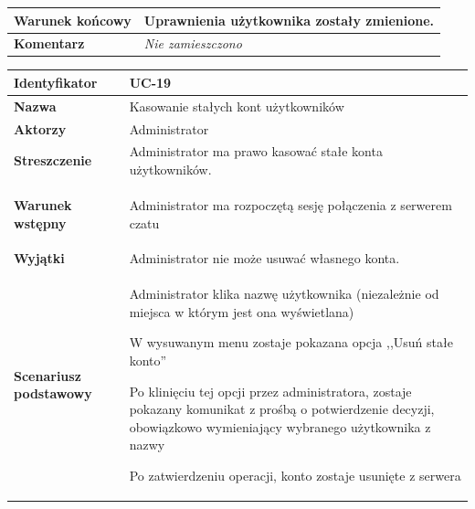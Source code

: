 {\begin{tabular}{ | l | l | }
	\hline
		\parbox[t]{4cm}{\textbf{Warunek końcowy}} & \parbox[t]{11cm}{
			Uprawnienia użytkownika zostały zmienione.
		}
		\\
		
	\hline
		\parbox[t]{4cm}{\textbf{Komentarz}} & \parbox[t]{11cm}{
			\textit{Nie zamieszczono}
		}
		\\

	\hline
\end{tabular}

\vspace{2em}

\begin{tabular}{ | l | l | }
	\hline
		\textbf{Identyfikator} & 
		UC-19
		\\
		
	\hline
		\textbf{Nazwa} & 
		Kasowanie stałych kont użytkowników
		\\
		
	\hline
		\textbf{Aktorzy} & \parbox[t]{11cm}{
			Administrator
		}\\
		 
	\hline
		\parbox[t]{4cm}{\textbf{Streszczenie}} & \parbox[t]{11cm}{
			Administrator ma prawo kasować stałe konta użytkowników.
			
		}\\
		
	\hline
		\parbox[t]{4cm}{\textbf{Warunek wstępny}} & \parbox[t]{11cm}{
			\begin{enumreq}
				\item Administrator ma rozpoczętą sesję połączenia z serwerem
				czatu
			\end{enumreq}
				
		}
		\\
		
	\hline
		\parbox[t]{4cm}{\textbf{Wyjątki}} & \parbox[t]{11cm}{
			Administrator nie może usuwać własnego konta.
			
		}
		\\

	\hline
		\parbox[t]{4cm}{\textbf{Scenariusz podstawowy}} & \parbox[t]{11cm}{
			\begin{enumreq}
				\item Administrator klika nazwę użytkownika (niezależnie od
				miejsca w którym jest ona wyświetlana)
				\item W wysuwanym menu zostaje pokazana opcja ,,Usuń stałe
				konto''
				\item Po klinięciu tej opcji przez administratora, zostaje
				pokazany komunikat z prośbą o potwierdzenie decyzji,
				obowiązkowo wymieniający wybranego użytkownika z nazwy
				\item Po zatwierdzeniu operacji, konto zostaje usunięte z
				serwera
			\end{enumreq}
		}
		\\
		

\end{tabular}}
